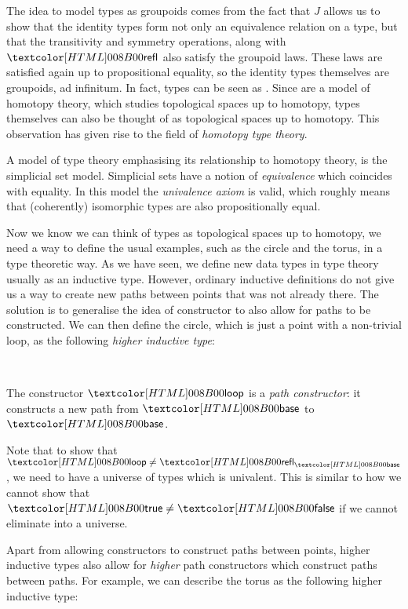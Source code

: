 The idea to model types as groupoids comes from the fact that $J$
allows us to show that the identity types form not only an equivalence
relation on a type, but that the transitivity and symmetry operations,
along with $\refl$ also satisfy the groupoid laws. These laws are
satisfied again up to propositional equality, so the identity types
themselves are groupoids, ad infinitum. In fact, types can be seen as
\inftygrpds. Since \inftygrpds are a model of homotopy theory, which
studies topological spaces up to homotopy, types themselves can also
be thought of as topological spaces up to homotopy. This observation
has given rise to the field of \emph{homotopy type theory}.

A model of type theory emphasising its relationship to homotopy
theory, is the simplicial set model. Simplicial sets have a notion of
\emph{equivalence} which coincides with equality. In this model the
\emph{univalence axiom} is valid, which roughly means that
(coherently) isomorphic types are also propositionally equal.

Now we know we can think of types as topological spaces up to
homotopy, we need a way to define the usual examples, such as the
circle and the torus, in a type theoretic way. As we have seen, we
define new data types in type theory usually as an inductive
type. However, ordinary inductive definitions do not give us a way to
create new paths between points that was not already there. The
solution is to generalise the idea of constructor to also allow for
paths to be constructed. We can then define the circle, which is just
a point with a non-trivial loop, as the following \emph{higher
  inductive type}:
\begin{datatype}{\circlety}{\Type}
  \constr{\circlebase}{\circlety} \\
  \constr{\circleloop}{\circlebase = \circlebase}
\end{datatype}
The constructor $\circleloop$ is a \emph{path constructor}: it
constructs a new path from $\circlebase$ to $\circlebase$. 


Note that to show that $\circleloop \neq \refl_{\circlebase}$, we need
to have a universe of types which is univalent. This is similar to how
we cannot show that $\boolt \neq \boolf$ if we cannot eliminate into a
universe.

Apart from allowing constructors to construct paths between points,
higher inductive types also allow for \emph{higher} path constructors
which construct paths between paths. For example, we can describe the
torus as the following higher inductive type:
\begin{datatype}{\torusty}{\Type}
  \constr{\torusbase}{\torusty} \\
  \constr{\torusp}{\torusbase = \torusbase} \\
  \constr{\torusq}{\torusbase = \torusbase} \\
  \constr{\torusr}{\torusp \ct \torusq = \torusq \ct \torusp}
\end{datatype}

